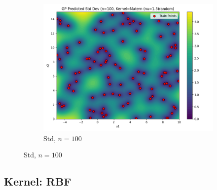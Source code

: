 \documentclass[a4paper,12pt]{article}
\begin{document}
\begin{figure}[H]
\begin{subfigure}{0.3\textwidth}
    \includegraphics[width=\linewidth]{Task-02/images/gp_std_matern_n100_random.png}
    \caption{Std, $n=100$}
\end{subfigure}
\end{figure}

\subsection*{Kernel: RBF}
\end{document}
